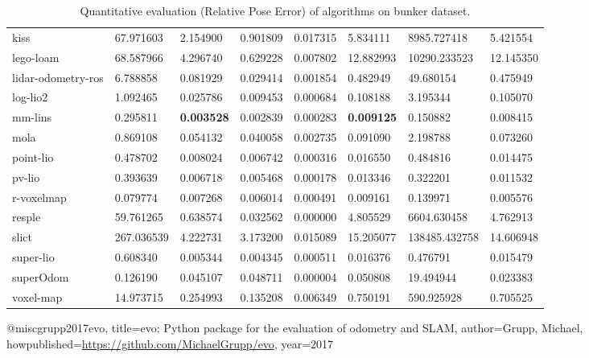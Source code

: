 \begin{table}[]
{\begin{tabular}{llllllll}
		kiss & 67.971603 & 2.154900 & 0.901809 & 0.017315 & 5.834111 & 8985.727418 & 5.421554 \\
		lego-loam & 68.587966 & 4.296740 & 0.629228 & 0.007802 & 12.882993 & 10290.233523 & 12.145350 \\
		lidar-odometry-ros & 6.788858 & 0.081929 & 0.029414 & 0.001854 & 0.482949 & 49.680154 & 0.475949 \\
		log-lio2 & 1.092465 & 0.025786 & 0.009453 & 0.000684 & 0.108188 & 3.195344 & 0.105070 \\
		mm-lins & 0.295811 & \textbf{0.003528} & 0.002839 & 0.000283 & \textbf{0.009125} & 0.150882 & 0.008415 \\
		mola & 0.869108 & 0.054132 & 0.040058 & 0.002735 & 0.091090 & 2.198788 & 0.073260 \\
		point-lio & 0.478702 & 0.008024 & 0.006742 & 0.000316 & 0.016550 & 0.484816 & 0.014475 \\
		pv-lio & 0.393639 & 0.006718 & 0.005468 & 0.000178 & 0.013346 & 0.322201 & 0.011532 \\
		r-voxelmap & 0.079774 & 0.007268 & 0.006014 & 0.000491 & 0.009161 & 0.139971 & 0.005576 \\
		resple & 59.761265 & 0.638574 & 0.032562 & 0.000000 & 4.805529 & 6604.630458 & 4.762913 \\
		slict & 267.036539 & 4.222731 & 3.173200 & 0.015089 & 15.205077 & 138485.432758 & 14.606948 \\
		super-lio & 0.608340 & 0.005344 & 0.004345 & 0.000511 & 0.016376 & 0.476791 & 0.015479 \\
		superOdom & 0.126190 & 0.045107 & 0.048711 & 0.000004 & 0.050808 & 19.494944 & 0.023383 \\
		voxel-map & 14.973715 & 0.254993 & 0.135208 & 0.006349 & 0.750191 & 590.925928 & 0.705525 \\
        	\end{tabular}%
        }
        	\caption{Quantitative evaluation (Relative Pose Error\cite{grupp2017evo}) of algorithms on bunker dataset.}
        	\label{table3}
\end{table}

@misc{grupp2017evo,
  title={evo: Python package for the evaluation of odometry and SLAM},
  author={Grupp, Michael},
  howpublished={\url{https://github.com/MichaelGrupp/evo}},
  year={2017}
}
